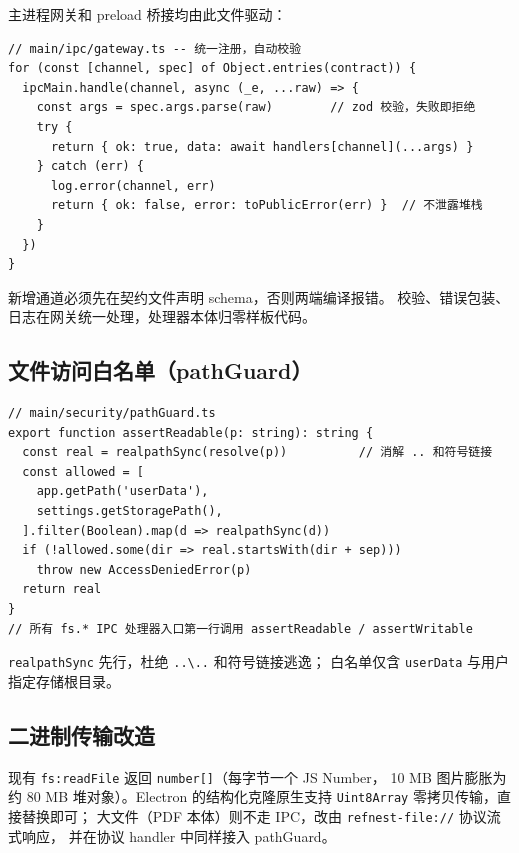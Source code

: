 \documentclass[12pt, a4paper]{article}
\begin{document}
主进程网关和 preload 桥接均由此文件驱动：

\begin{lstlisting}[language={}]
// main/ipc/gateway.ts -- 统一注册，自动校验
for (const [channel, spec] of Object.entries(contract)) {
  ipcMain.handle(channel, async (_e, ...raw) => {
    const args = spec.args.parse(raw)        // zod 校验，失败即拒绝
    try {
      return { ok: true, data: await handlers[channel](...args) }
    } catch (err) {
      log.error(channel, err)
      return { ok: false, error: toPublicError(err) }  // 不泄露堆栈
    }
  })
}
\end{lstlisting}

\begin{tcolorbox}[fixbox, title={对策 \#3a：解决「IPC 无校验」}]
  新增通道必须先在契约文件声明 schema，否则两端编译报错。
  校验、错误包装、日志在网关统一处理，处理器本体归零样板代码。
\end{tcolorbox}

\subsection{文件访问白名单（pathGuard）}

\begin{lstlisting}[language={}]
// main/security/pathGuard.ts
export function assertReadable(p: string): string {
  const real = realpathSync(resolve(p))          // 消解 .. 和符号链接
  const allowed = [
    app.getPath('userData'),
    settings.getStoragePath(),
  ].filter(Boolean).map(d => realpathSync(d))
  if (!allowed.some(dir => real.startsWith(dir + sep)))
    throw new AccessDeniedError(p)
  return real
}
// 所有 fs.* IPC 处理器入口第一行调用 assertReadable / assertWritable
\end{lstlisting}

\begin{tcolorbox}[fixbox, title={对策 \#3b：解决「任意文件读取」}]
  \texttt{realpathSync} 先行，杜绝 \texttt{..\textbackslash..} 和符号链接逃逸；
  白名单仅含 \texttt{userData} 与用户指定存储根目录。
\end{tcolorbox}

\subsection{二进制传输改造}

现有 \texttt{fs:readFile} 返回 \texttt{number[]}（每字节一个 JS Number，
10 MB 图片膨胀为约 80 MB 堆对象）。Electron 的结构化克隆原生支持
\texttt{Uint8Array} 零拷贝传输，直接替换即可；
大文件（PDF 本体）则不走 IPC，改由 \texttt{refnest-file://} 协议流式响应，
并在协议 handler 中同样接入 pathGuard。
\end{document}
